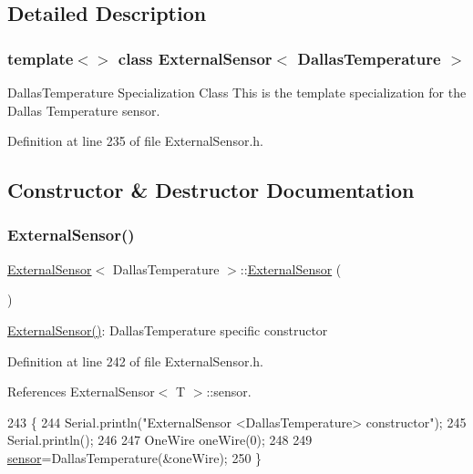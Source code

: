 \subsection{Detailed Description}
\subsubsection*{template$<$$>$\newline
class External\+Sensor$<$ Dallas\+Temperature $>$}

Dallas\+Temperature Specialization Class This is the template specialization for the Dallas Temperature sensor. 

Definition at line 235 of file External\+Sensor.\+h.



\subsection{Constructor \& Destructor Documentation}
\mbox{\label{classExternalSensor_3_01DallasTemperature_01_4_ad290681e8780cdf1870416eee99d699d}} 
\subsubsection{\texorpdfstring{External\+Sensor()}{ExternalSensor()}}
{\footnotesize\ttfamily \hyperlink{classExternalSensor}{External\+Sensor}$<$ Dallas\+Temperature $>$\+::\hyperlink{classExternalSensor}{External\+Sensor} (\begin{DoxyParamCaption}{ }\end{DoxyParamCaption})\hspace{0.3cm}{\ttfamily [inline]}}

\hyperlink{classExternalSensor_3_01DallasTemperature_01_4_ad290681e8780cdf1870416eee99d699d}{External\+Sensor()}\+: Dallas\+Temperature specific constructor 

Definition at line 242 of file External\+Sensor.\+h.



References External\+Sensor$<$ T $>$\+::sensor.


\begin{DoxyCode}
243     \{
244         Serial.println(\textcolor{stringliteral}{"ExternalSensor <DallasTemperature> constructor"});
245         Serial.println();
246 
247         OneWire oneWire(0);
248         
249         \hyperlink{classExternalSensor_3_01DallasTemperature_01_4_adb6ba4fcdedef95ad8f6b0c9b6c0f9d1}{sensor}=DallasTemperature(&oneWire);
250     \}
\end{DoxyCode}



